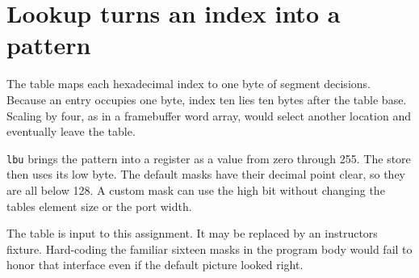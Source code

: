 \section{Lookup turns an index into a
  pattern}\label{005-seven-segment-counter-p03-lookup-turns-an-index-into-a-pattern}

The table maps each hexadecimal index to one byte of segment decisions.
Because an entry occupies one byte, index ten lies ten bytes after the
table base. Scaling by four, as in a framebuffer word array, would
select another location and eventually leave the table.

\texttt{lbu} brings the pattern into a register as a value from zero
through 255. The store then uses its low byte. The default masks have
their decimal point clear, so they are all below 128. A custom mask can
use the high bit without changing the table\textquotesingle s element
size or the port width.

The table is input to this assignment. It may be replaced by an
instructor\textquotesingle s fixture. Hard-coding the familiar sixteen
masks in the program body would fail to honor that interface even if the
default picture looked right.
